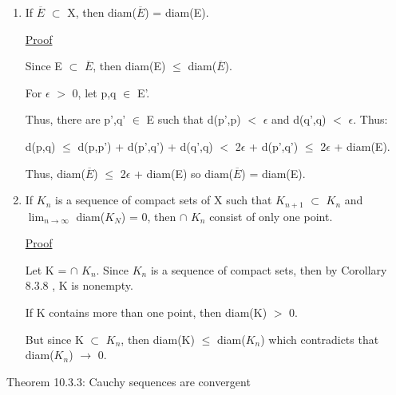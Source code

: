     \begin{enumerate}[label=(\alph*), leftmargin=2cm, itemsep=0.1cm]
        \item If $\overline{E}$ $\subset$ X, then diam($\overline{E}$) = diam(E).
        
            { \color{magenta} \underline{Proof} }

                Since E $\subset$ $\overline{E}$, then
                diam(E) $\leq$ diam($\overline{E}$).

                For $\epsilon$ $>$ 0, let p,q $\in$ E'.

                Thus, there are p',q' $\in$ E such that
                d(p',p) $<$ $\epsilon$ and d(q',q) $<$ $\epsilon$.
                Thus:

                d(p,q) $\leq$ d(p,p') + d(p',q') + d(q',q)
                $<$ 2$\epsilon$ + d(p',q')
                $\leq$ 2$\epsilon$ + diam(E).

                Thus, diam($\overline{E}$) $\leq$ 2$\epsilon$ + diam(E)
                so diam($\overline{E}$) = diam(E).

        \item If $K_n$ is a sequence of compact sets of X such that
        $K_{n+1}$ $\subset$ $K_n$ and $\lim_{n \rightarrow \infty}$ diam($K_N$) = 0,
        then $\cap$ $K_n$ consist of only one point.
        
            { \color{magenta} \underline{Proof} }

                Let K = $\cap$ $K_n$.
                Since $K_n$ is a sequence of compact sets, then
                by { \color{orange} Corollary 8.3.8 }, K is nonempty.

                If K contains more than one point, then diam(K) $>$ 0.

                But since K $\subset$ $K_n$, then diam(K) $\leq$ diam($K_n$)
                which contradicts that diam($K_n$) $\rightarrow$ 0. \\
    \end{enumerate}

{ \color{red} Theorem 10.3.3: Cauchy sequences are convergent }

